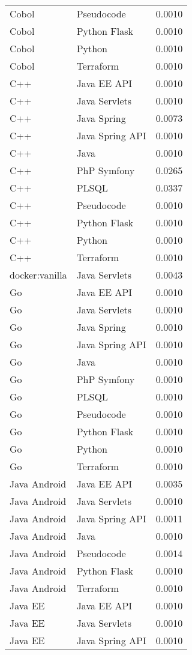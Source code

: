 {\begin{longtable}{lll}
Cobol & Pseudocode & 0.0010\\
Cobol & Python Flask & 0.0010\\
Cobol & Python & 0.0010\\
Cobol & Terraform & 0.0010\\
C++ & Java EE API & 0.0010\\
C++ & Java Servlets & 0.0010\\
C++ & Java Spring & 0.0073\\
C++ & Java Spring API & 0.0010\\
C++ & Java & 0.0010\\
C++ & PhP Symfony & 0.0265\\
C++ & PLSQL & 0.0337\\
C++ & Pseudocode & 0.0010\\
C++ & Python Flask & 0.0010\\
C++ & Python & 0.0010\\
C++ & Terraform & 0.0010\\
docker:vanilla & Java Servlets & 0.0043\\
Go & Java EE API & 0.0010\\
Go & Java Servlets & 0.0010\\
Go & Java Spring & 0.0010\\
Go & Java Spring API & 0.0010\\
Go & Java & 0.0010\\
Go & PhP Symfony & 0.0010\\
Go & PLSQL & 0.0010\\
Go & Pseudocode & 0.0010\\
Go & Python Flask & 0.0010\\
Go & Python & 0.0010\\
Go & Terraform & 0.0010\\
Java Android & Java EE API & 0.0035\\
Java Android & Java Servlets & 0.0010\\
Java Android & Java Spring API & 0.0011\\
Java Android & Java & 0.0010\\
Java Android & Pseudocode & 0.0014\\
Java Android & Python Flask & 0.0010\\
Java Android & Terraform & 0.0010\\
Java EE & Java EE API & 0.0010\\
Java EE & Java Servlets & 0.0010\\
Java EE & Java Spring API & 0.0010\\

\end{longtable}}
